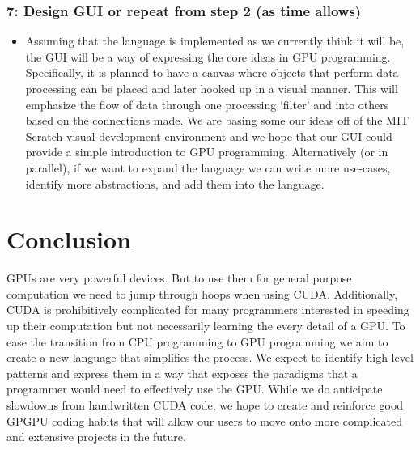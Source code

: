 \documentclass{article}
\begin{document}
\subsubsection*{7: Design GUI or repeat from step 2 (as time allows)}
\begin{itemize}
  \item Assuming that the language is implemented as we currently think it will be, the GUI will be a way of expressing the core ideas in GPU programming. Specifically, it is planned to have a canvas where objects that perform data processing can be placed and later hooked up in a visual manner. This will emphasize the flow of data through one processing `filter' and into others based on the connections made. We are basing some our ideas off of the MIT Scratch visual development environment and we hope that our GUI could provide a simple introduction to GPU programming. Alternatively (or in parallel), if we want to expand the language we can write more use-cases, identify more abstractions, and add them into the language.
\end{itemize}

\section{Conclusion}

GPUs are very powerful devices. But to use them for general purpose computation we need to jump through hoops when using CUDA. Additionally, CUDA is prohibitively complicated for many programmers interested in speeding up their computation but not necessarily learning the every detail of a GPU. To ease the transition from CPU programming to GPU programming we aim to create a new language that simplifies the process. We expect to identify high level patterns and express them in a way that exposes the paradigms that a programmer would need to effectively use the GPU. While we do anticipate slowdowns from handwritten CUDA code, we hope to create and reinforce good GPGPU coding habits that will allow our users to move onto more complicated and extensive projects in the future.




\end{document}

